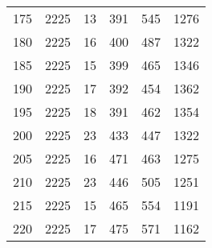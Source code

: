 \begin{longtable}{|l|l|l|l|l|l|}
175 & 2225 & 13 & 391 & 545 & 1276 \\
180 & 2225 & 16 & 400 & 487 & 1322 \\
185 & 2225 & 15 & 399 & 465 & 1346 \\
190 & 2225 & 17 & 392 & 454 & 1362 \\
195 & 2225 & 18 & 391 & 462 & 1354 \\
200 & 2225 & 23 & 433 & 447 & 1322 \\
205 & 2225 & 16 & 471 & 463 & 1275 \\
210 & 2225 & 23 & 446 & 505 & 1251 \\
215 & 2225 & 15 & 465 & 554 & 1191 \\
220 & 2225 & 17 & 475 & 571 & 1162 \\

	\bottomrule
\end{longtable}




